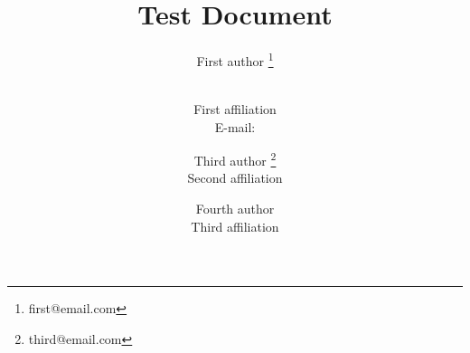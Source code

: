 \documentclass{PoS}
\title{Test Document}
\author{First author \thanks{first@email.com}}
\author{
\speaker{Speaker}\\
First affiliation\\
E-mail: \email{second@email.com}
}
\author{Third author \thanks{third@email.com}\\Second affiliation}
\author{Fourth author\\Third affiliation}
\begin{document}
\blinddocument
\end{document}
